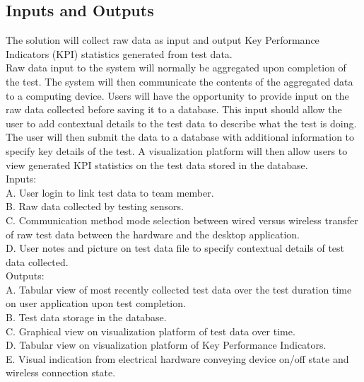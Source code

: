 \documentclass[12pt]{article}
\begin{document}
\subsection{Inputs and Outputs}


The solution will collect raw data as input and output Key Performance Indicators (KPI) statistics generated from test data. \\

Raw data input to the system will normally be aggregated upon completion of the test. The system will then communicate the contents of the aggregated data to a computing device. Users will have the opportunity to provide input on the raw data collected before saving it to a database. This input should allow the user to add contextual details to the test data to describe what the test is doing. The user will then submit the data to a database with additional information to specify key details of the test. A visualization platform will then allow users to view generated KPI statistics on the test data stored in the database. \\

Inputs: \\
A. User login to link test data to team member. \\
B. Raw data collected by testing sensors. \\
C. Communication method mode selection between wired versus wireless transfer of raw test data between the hardware and the desktop application. \\
D. User notes and picture on test data file to specify contextual details of test data collected. \\

Outputs: \\
A. Tabular view of most recently collected test data over the test duration time on user application upon test completion. \\
B. Test data storage in the database. \\
C. Graphical view on visualization platform of test data over time. \\
D. Tabular view on visualization platform of Key Performance Indicators. \\
E. Visual indication from electrical hardware conveying device on/off state and wireless connection state. 
\end{document}

